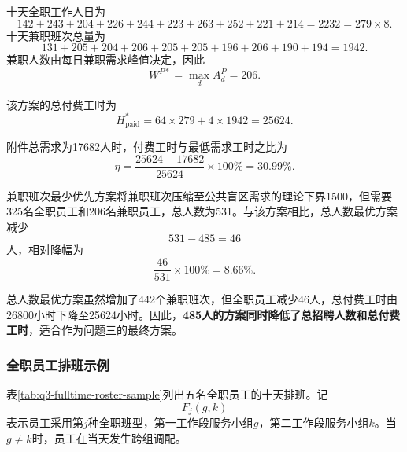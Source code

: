\documentclass[withoutpreface,bwprint]{cumcmthesis}
\begin{document}
\begin{table}[H]
\centering
\caption{总人数最优混合方案的逐日人员配置}
\label{tab:q3-daily-staff}
\end{table}

十天全职工作人日为
\[
142+243+204+226+244+223+263+252+221+214
=
2232
=
279\times8.
\]
十天兼职班次总量为
\[
131+205+204+206+205+205+196+206+190+194
=
1942.
\]
兼职人数由每日兼职需求峰值决定，因此
\[
W^{P*}
=
\max_d A_d^P
=
206.
\]

该方案的总付费工时为
\begin{equation}
H_{\mathrm{paid}}^*
=
64\times279+4\times1942
=
25624.
\label{eq:q3-paid-hours-result}
\end{equation}

附件总需求为17682人时，付费工时与最低需求工时之比为
\begin{equation}
\eta
=
\frac{25624-17682}{25624}\times100\%
=
30.99\%.
\label{eq:q3-waste-rate}
\end{equation}

兼职班次最少优先方案将兼职班次压缩至公共盲区需求的理论下界1500，但需要325名全职员工和206名兼职员工，总人数为531。与该方案相比，总人数最优方案减少
\begin{equation}
531-485=46
\end{equation}
人，相对降幅为
\begin{equation}
\frac{46}{531}\times100\%=8.66\%.
\end{equation}

总人数最优方案虽然增加了442个兼职班次，但全职员工减少46人，总付费工时由26800小时下降至25624小时。因此，\textbf{485人的方案同时降低了总招聘人数和总付费工时}，适合作为问题三的最终方案。

\subsubsection{全职员工排班示例}

表\ref{tab:q3-fulltime-roster-sample}列出五名全职员工的十天排班。记
\[
F_j(g,k)
\]
表示员工采用第$j$种全职班型，第一工作段服务小组$g$，第二工作段服务小组$k$。当$g\neq k$时，员工在当天发生跨组调配。
\end{document}
